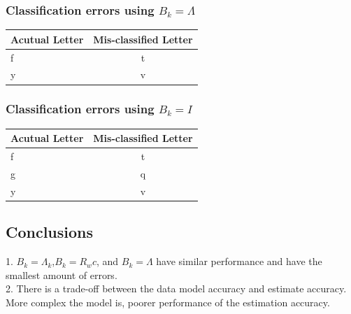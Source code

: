 \documentclass{article}
\begin{document}
		\subsubsection{Classification errors using $B_{k}=\Lambda$}
			\begin{center}
				\begin{tabular}{| l | c |}
					\hline
					Acutual Letter & Mis-classified Letter \\ \hline
					f & t \\ \hline
					y & v \\ \hline
				\end{tabular}
			\end{center}
		\subsubsection{Classification errors using $B_{k}=I$}
			\begin{center}
				\begin{tabular}{| l | c |}
					\hline
					Acutual Letter & Mis-classified Letter \\ \hline
					f & t \\ \hline
					g & q \\ \hline
					y & v \\ \hline
				\end{tabular}
			\end{center}
	\subsection{Conclusions}
		1. $B_k=\Lambda_k$,$B_k=R_wc$, and $B_k=\Lambda$ have similar
		performance and have the smallest amount of errors. \\
		2. There is a trade-off between the data model accuracy and estimate
		accuracy. More complex the model is, poorer performance of the
		estimation accuracy.
\end{document}
